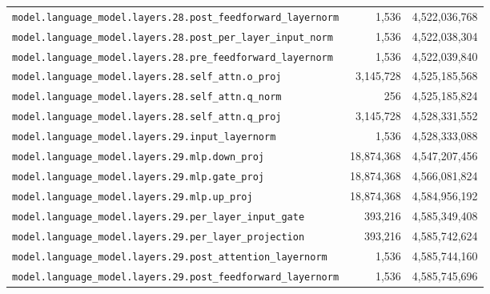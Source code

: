 \documentclass[10pt,a4paper]{article}
\theoremstyle{definition}
\begin{document}
\begin{appendices}
\begin{longtable}{p{9.5cm}rr}
\texttt{model.\allowbreak{}language\_model.\allowbreak{}layers.\allowbreak{}28.\allowbreak{}post\_feedforward\_layernorm} & 1,536 & 4,522,036,768 \\
\texttt{model.\allowbreak{}language\_model.\allowbreak{}layers.\allowbreak{}28.\allowbreak{}post\_per\_layer\_input\_norm} & 1,536 & 4,522,038,304 \\
\texttt{model.\allowbreak{}language\_model.\allowbreak{}layers.\allowbreak{}28.\allowbreak{}pre\_feedforward\_layernorm} & 1,536 & 4,522,039,840 \\
\texttt{model.\allowbreak{}language\_model.\allowbreak{}layers.\allowbreak{}28.\allowbreak{}self\_attn.\allowbreak{}o\_proj} & 3,145,728 & 4,525,185,568 \\
\texttt{model.\allowbreak{}language\_model.\allowbreak{}layers.\allowbreak{}28.\allowbreak{}self\_attn.\allowbreak{}q\_norm} & 256 & 4,525,185,824 \\
\texttt{model.\allowbreak{}language\_model.\allowbreak{}layers.\allowbreak{}28.\allowbreak{}self\_attn.\allowbreak{}q\_proj} & 3,145,728 & 4,528,331,552 \\
\texttt{model.\allowbreak{}language\_model.\allowbreak{}layers.\allowbreak{}29.\allowbreak{}input\_layernorm} & 1,536 & 4,528,333,088 \\
\texttt{model.\allowbreak{}language\_model.\allowbreak{}layers.\allowbreak{}29.\allowbreak{}mlp.\allowbreak{}down\_proj} & 18,874,368 & 4,547,207,456 \\
\texttt{model.\allowbreak{}language\_model.\allowbreak{}layers.\allowbreak{}29.\allowbreak{}mlp.\allowbreak{}gate\_proj} & 18,874,368 & 4,566,081,824 \\
\texttt{model.\allowbreak{}language\_model.\allowbreak{}layers.\allowbreak{}29.\allowbreak{}mlp.\allowbreak{}up\_proj} & 18,874,368 & 4,584,956,192 \\
\texttt{model.\allowbreak{}language\_model.\allowbreak{}layers.\allowbreak{}29.\allowbreak{}per\_layer\_input\_gate} & 393,216 & 4,585,349,408 \\
\texttt{model.\allowbreak{}language\_model.\allowbreak{}layers.\allowbreak{}29.\allowbreak{}per\_layer\_projection} & 393,216 & 4,585,742,624 \\
\texttt{model.\allowbreak{}language\_model.\allowbreak{}layers.\allowbreak{}29.\allowbreak{}post\_attention\_layernorm} & 1,536 & 4,585,744,160 \\
\texttt{model.\allowbreak{}language\_model.\allowbreak{}layers.\allowbreak{}29.\allowbreak{}post\_feedforward\_layernorm} & 1,536 & 4,585,745,696 \\

\end{longtable}
\end{appendices}
\end{document}
